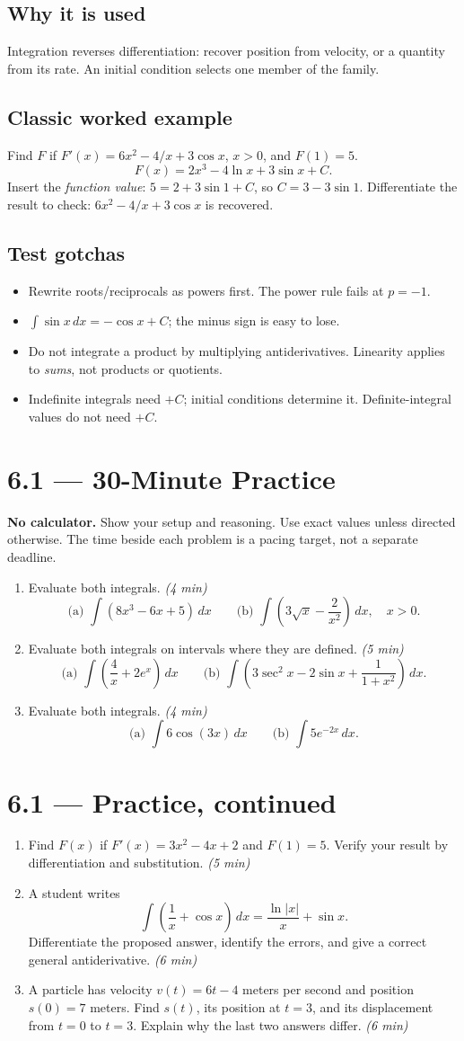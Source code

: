 \documentclass[11pt]{article}
\newcommand{\practice}[2]{\clearpage\section*{#1 --- 30-Minute Practice}\textbf{#2} Show your setup and reasoning. Use exact values unless directed otherwise. The time beside each problem is a pacing target, not a separate deadline.}
\newcommand{\continued}[1]{\clearpage\section*{#1 --- Practice, continued}}
\newcommand{\mins}[1]{\hfill\textit{(#1 min)}}
\newcommand{\dx}{\,dx}
\begin{document}
\subsection*{Why it is used}
Integration reverses differentiation: recover position from velocity, or a quantity from its rate. An initial condition selects one member of the family.

\subsection*{Classic worked example}
Find $F$ if $F'(x)=6x^2-4/x+3\cos x$, $x>0$, and $F(1)=5$.
\[
F(x)=2x^3-4\ln x+3\sin x+C.
\]
Insert the \emph{function value}: $5=2+3\sin1+C$, so $C=3-3\sin1$.
Differentiate the result to check: $6x^2-4/x+3\cos x$ is recovered.

\subsection*{Test gotchas}
\begin{itemize}
\item Rewrite roots/reciprocals as powers first. The power rule fails at $p=-1$.
\item $\int\sin x\dx=-\cos x+C$; the minus sign is easy to lose.
\item Do not integrate a product by multiplying antiderivatives. Linearity applies to \emph{sums}, not products or quotients.
\item Indefinite integrals need $+C$; initial conditions determine it. Definite-integral values do not need $+C$.
\end{itemize}

\practice{6.1}{No calculator.}
\begin{enumerate}
\item Evaluate both integrals. \mins{4}
\[
\text{(a) }\int(8x^3-6x+5)\dx\qquad
\text{(b) }\int\left(3\sqrt{x}-\frac{2}{x^2}\right)\dx,\quad x>0.
\]
\vfill
\item Evaluate both integrals on intervals where they are defined. \mins{5}
\[
\text{(a) }\int\left(\frac4x+2e^x\right)\dx\qquad
\text{(b) }\int\left(3\sec^2x-2\sin x+\frac{1}{1+x^2}\right)\dx.
\]
\vfill
\item Evaluate both integrals. \mins{4}
\[
\text{(a) }\int6\cos(3x)\dx\qquad
\text{(b) }\int5e^{-2x}\dx.
\]
\vfill
\end{enumerate}
\continued{6.1}
\begin{enumerate}[start=4]
\item Find $F(x)$ if $F'(x)=3x^2-4x+2$ and $F(1)=5$. Verify your result by differentiation and substitution. \mins{5}
\vfill
\item A student writes
\[
\int\left(\frac1x+\cos x\right)\dx=\frac{\ln|x|}{x}+\sin x.
\]
Differentiate the proposed answer, identify the errors, and give a correct general antiderivative. \mins{6}
\vfill
\item A particle has velocity $v(t)=6t-4$ meters per second and position $s(0)=7$ meters.
Find $s(t)$, its position at $t=3$, and its displacement from $t=0$ to $t=3$. Explain why the last two answers differ. \mins{6}
\vfill
\end{enumerate}
\end{document}

